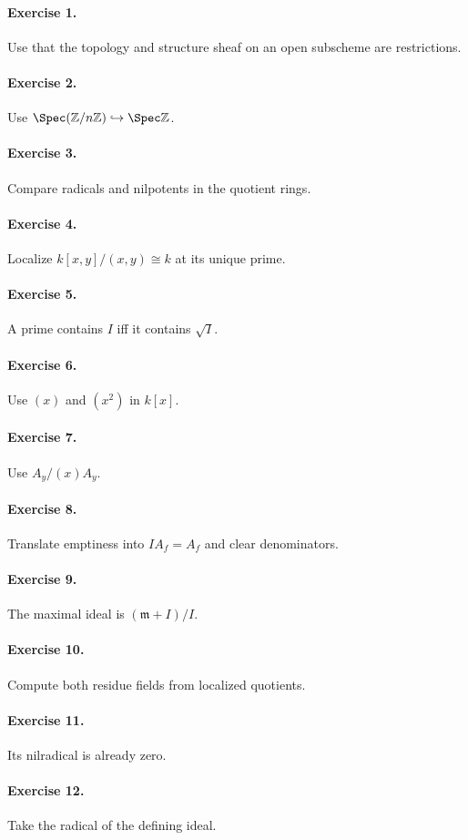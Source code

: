\paragraph{Exercise 1.} Use that the topology and structure sheaf on an open subscheme are restrictions.
\paragraph{Exercise 2.} Use $\Spec(\mathbb Z/n\mathbb Z)\hookrightarrow\Spec\mathbb Z$.
\paragraph{Exercise 3.} Compare radicals and nilpotents in the quotient rings.
\paragraph{Exercise 4.} Localize $k[x,y]/(x,y)\cong k$ at its unique prime.
\paragraph{Exercise 5.} A prime contains $I$ iff it contains $\sqrt I$.
\paragraph{Exercise 6.} Use $(x)$ and $(x^2)$ in $k[x]$.
\paragraph{Exercise 7.} Use $A_y/(x)A_y$.
\paragraph{Exercise 8.} Translate emptiness into $IA_f=A_f$ and clear denominators.
\paragraph{Exercise 9.} The maximal ideal is $(\mathfrak m+I)/I$.
\paragraph{Exercise 10.} Compute both residue fields from localized quotients.
\paragraph{Exercise 11.} Its nilradical is already zero.
\paragraph{Exercise 12.} Take the radical of the defining ideal.
